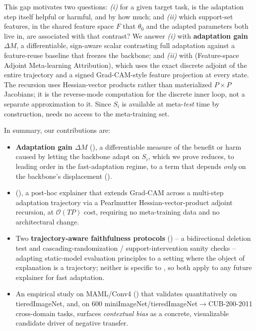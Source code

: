This gap motivates two questions: \emph{(i)} for a given target task, is the adaptation step itself helpful or harmful, and by how much; and \emph{(ii)} which support-set features, in the shared feature space $F$ that $\theta_0$ and the adapted parameters both live in, are associated with that contrast? We answer \emph{(i)} with \textbf{adaptation gain} $\Delta M$, a differentiable, sign-aware scalar contrasting full adaptation against a feature-reuse baseline that freezes the backbone; and \emph{(ii)} with \textbf{\fama} (Feature-space Adjoint Meta-learning Attribution), which uses the exact discrete adjoint of the entire trajectory and a signed Grad-CAM-style feature projection at every state. The recursion uses Hessian-vector products rather than materialized $P\times P$ Jacobians; it is the reverse-mode computation for the discrete inner loop, not a separate approximation to it. Since $S_i$ is available at meta-\emph{test} time by construction, \fama needs no access to the meta-training set.

In summary, our contributions are:
\begin{itemize}[leftmargin=*,itemsep=1pt,topsep=2pt]
    \item \textbf{Adaptation gain $\Delta M$} (), a differentiable measure of the benefit or harm caused by letting the backbone adapt on $S_i$, which we prove reduces, to leading order in the fast-adaptation regime, to a term that depends \emph{only} on the backbone's displacement ().
    \item \textbf{\fama} (), a post-hoc explainer that extends Grad-CAM across a multi-step adaptation trajectory via a Pearlmutter Hessian-vector-product adjoint recursion, at $\mathcal{O}(TP)$ cost, requiring no meta-training data and no architectural change.
    \item Two \textbf{trajectory-aware faithfulness protocols} () -- a bidirectional deletion test and cascading-randomization / support-intervention sanity checks -- adapting static-model evaluation principles \citep{samek2016evaluating,petsiuk2018rise,adebayo2018sanity} to a setting where the object of explanation is a trajectory; neither is specific to \fama, so both apply to any future explainer for fast adaptation.
    \item An empirical study on MAML/Conv4 () that validates \fama quantitatively on tieredImageNet, and, on 600 miniImageNet/tieredImageNet$\to$CUB-200-2011 cross-domain tasks, surfaces \emph{contextual bias} as a concrete, visualizable candidate driver of negative transfer.
\end{itemize}
